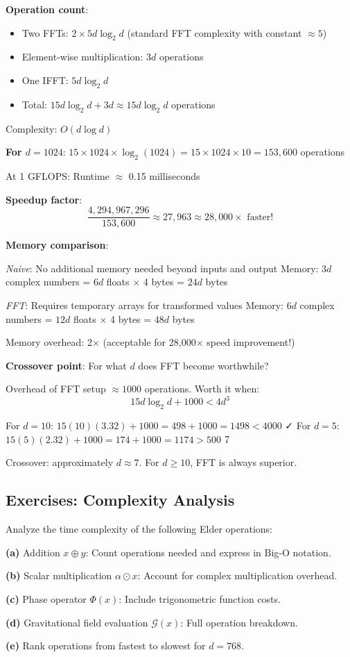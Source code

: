 \begin{example}
\textbf{Operation count}:
\begin{itemize}
\item Two FFTs: $2 \times 5d\log_2 d$ (standard FFT complexity with constant $\approx 5$)
\item Element-wise multiplication: $3d$ operations
\item One IFFT: $5d\log_2 d$
\item Total: $15d\log_2 d + 3d \approx 15d\log_2 d$ operations
\end{itemize}

Complexity: $O(d \log d)$

\textbf{For $d=1024$}: $15 \times 1024 \times \log_2(1024) = 15 \times 1024 \times 10 = 153,600$ operations

At 1 GFLOPS: Runtime $\approx$ 0.15 milliseconds

\textbf{Speedup factor}:
$$\frac{4,294,967,296}{153,600} \approx 27,963 \approx 28,000\times \text{ faster!}$$

\textbf{Memory comparison}:

\textit{Naive}: No additional memory needed beyond inputs and output  
Memory: $3d$ complex numbers = $6d$ floats $\times$ 4 bytes = $24d$ bytes

\textit{FFT}: Requires temporary arrays for transformed values  
Memory: $6d$ complex numbers = $12d$ floats $\times$ 4 bytes = $48d$ bytes

Memory overhead: 2× (acceptable for 28,000× speed improvement!)

\textbf{Crossover point}: For what $d$ does FFT become worthwhile?

Overhead of FFT setup $\approx 1000$ operations. Worth it when:
$$15d\log_2 d + 1000 < 4d^3$$

For $d=10$: $15(10)(3.32) + 1000 = 498 + 1000 = 1498 < 4000$ ✓  
For $d=5$: $15(5)(2.32) + 1000 = 174 + 1000 = 1174 > 500$ $\xmark$

Crossover: approximately $d \approx 7$. For $d \geq 10$, FFT is always superior.

\end{example}

\subsection{Exercises: Complexity Analysis}

\begin{exercise}
Analyze the time complexity of the following Elder operations:

\textbf{(a)} Addition $x \oplus y$: Count operations needed and express in Big-O notation.

\textbf{(b)} Scalar multiplication $\alpha \odot x$: Account for complex multiplication overhead.

\textbf{(c)} Phase operator $\Phi(x)$: Include trigonometric function costs.

\textbf{(d)} Gravitational field evaluation $\mathcal{G}(x)$: Full operation breakdown.

\textbf{(e)} Rank operations from fastest to slowest for $d=768$.
\end{exercise}

